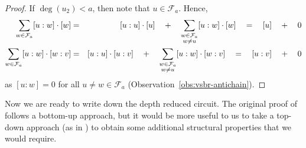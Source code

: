 \begin{proof}
If $\deg(u_2) < a$, then note that $u \in \mathcal{F}_a$. Hence,
\begin{eqnarray*}
\sum_{w\in \mathcal{F}_a} [u:w] \cdot [w] &=& [u:u] \cdot [u] \quad + \quad\sum_{\substack{w\in \mathcal{F}_a\\w\neq u}} [u:w] \cdot [w] \quad = \quad [u] \quad + \quad 0\\
\sum_{w\in \mathcal{F}_a} [u:w] \cdot [w:v] &=& [u:u] \cdot [u:v] \quad + \quad\sum_{\substack{w\in \mathcal{F}_a\\w\neq u}} [u:w] \cdot [w:v] \quad = \quad [u:v] \quad + \quad 0
\end{eqnarray*}
as $[u:w] = 0$ for all $u\neq w \in \mathcal{F}_a$ (Observation~\ref{obs:vsbr-antichain}).
\end{proof}

Now we are ready to write down the depth reduced circuit. The original proof of \cite{vsbr83} follows a bottom-up approach, but it would be more useful to us to take a top-down approach (as in \cite{ajmv98}) to obtain some additional structural properties that we would require. \\


